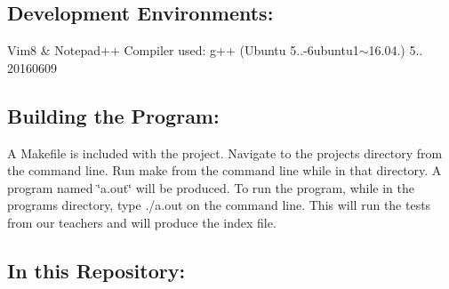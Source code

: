 \subsection*{Development Environments\+:}

Vim8 \& Notepad++ Compiler used\+: g++ (Ubuntu 5..-\/6ubuntu1$\sim$16.04.) 5.. 20160609

\subsection*{Building the Program\+:}

A Makefile is included with the project. Navigate to the project\textquotesingle{}s directory from the command line. Run {\ttfamily make} from the command line while in that directory. A program named \char`\"{}a.\+out\char`\"{} will be produced. To run the program, while in the program\textquotesingle{}s directory, type {\ttfamily ./a.out} on the command line. This will run the tests from our teachers and will produce the index file.

\subsection*{In this Repository\+:}

